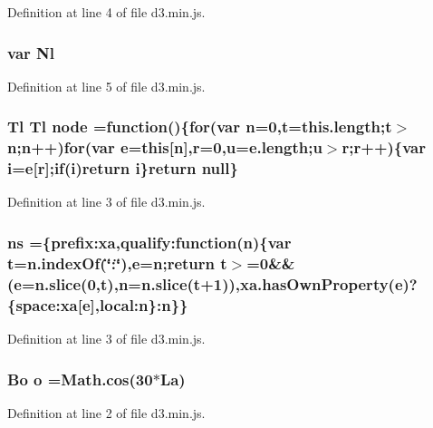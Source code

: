 Definition at line 4 of file d3.\+min.\+js.

\subsubsection[{Nl}]{\setlength{\rightskip}{0pt plus 5cm}var Nl}\label{d3_8min_8js_a7e13ec2961caa8e44749cf7b19584617}


Definition at line 5 of file d3.\+min.\+js.

\subsubsection[{node}]{ {\bf Tl} {\bf Tl} node =function()\{{\bf for}(var {\bf n}=0,t=this.\+length;t$>${\bf n};{\bf n}++){\bf for}(var {\bf e}={\bf this}[{\bf n}],{\bf r}=0,u=e.\+length;u$>${\bf r};{\bf r}++)\{var {\bf i}={\bf e}[{\bf r}];{\bf if}({\bf i}){\bf return} {\bf i}\}{\bf return} null\}}\label{d3_8min_8js_ae39b3ab5ef223a729c71deb4a57170af}


Definition at line 3 of file d3.\+min.\+js.

\subsubsection[{ns}]{ ns =\{prefix\+:xa,qualify\+:function({\bf n})\{var t=n.\+index\+Of(\char`\"{}\+:\char`\"{}),{\bf e}={\bf n};{\bf return} t$>$=0\&\&({\bf e}=n.\+slice(0,t),{\bf n}=n.\+slice(t+1)),xa.\+has\+Own\+Property({\bf e})?\{space\+:xa[{\bf e}],local\+:n\}\+:{\bf n}\}\}}\label{d3_8min_8js_ad2ad6bdb65796c2a150f00181c4708d4}


Definition at line 3 of file d3.\+min.\+js.

\subsubsection[{o}]{ {\bf Bo} o =Math.\+cos(30$\ast${\bf La})}\label{d3_8min_8js_aa6273e62c00518b17dcc42825d7901e5}


Definition at line 2 of file d3.\+min.\+js.

